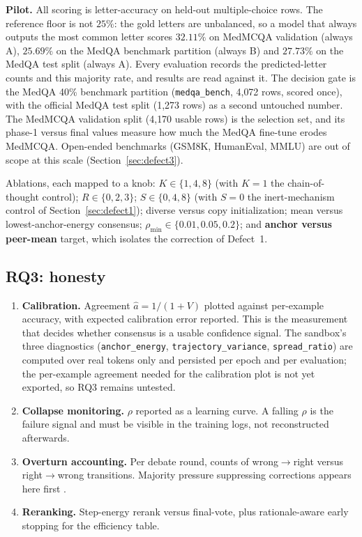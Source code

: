 \documentclass[11pt,a4paper]{article}
\newcommand{\rhodim}{\rho}
\theoremstyle{plain}
\theoremstyle{definition}
\theoremstyle{remark}
\begin{document}
\noindent
\textbf{Pilot.} All scoring is letter-accuracy on held-out multiple-choice rows.
The reference floor is not $25\%$: the gold letters are unbalanced, so a
model that always outputs the most common letter scores $32.11\%$ on MedMCQA
validation (always A), $25.69\%$ on the MedQA benchmark partition (always B)
and $27.73\%$ on the MedQA test split (always A). Every evaluation records
the predicted-letter counts and this majority rate, and results are read
against it. The decision gate is the MedQA 40\% benchmark partition
(\texttt{medqa\_bench}, 4{,}072 rows, scored once), with the official MedQA
test split (1{,}273 rows) as a second untouched number. The MedMCQA validation
split (4{,}170 usable rows) is the selection set, and its phase-1 versus final values
measure how much the MedQA fine-tune erodes MedMCQA. Open-ended benchmarks
(GSM8K, HumanEval, MMLU) are out of scope at this scale
(Section~\ref{sec:defect3}).

\noindent
Ablations, each mapped to a knob: $K \in \{1,4,8\}$ (with $K{=}1$ the
chain-of-thought control); $R \in \{0,2,3\}$; $S \in \{0,4,8\}$ (with
$S{=}0$ the inert-mechanism control of Section~\ref{sec:defect1}); diverse
versus copy initialization; mean versus lowest-anchor-energy consensus;
$\rhodim_{\min} \in \{0.01, 0.05, 0.2\}$; and \textbf{anchor versus peer-mean}
target, which isolates the correction of Defect~1.

\subsection{RQ3: honesty}

\begin{enumerate}
  \item \textbf{Calibration.} Agreement $\hat a = 1/(1+V)$ plotted against
    per-example accuracy, with expected calibration error reported. This is the
    measurement that decides whether consensus is a usable confidence signal.
    The sandbox's three diagnostics (\texttt{anchor\_energy},
    \texttt{trajectory\_variance}, \texttt{spread\_ratio}) are computed over
    real tokens only and persisted per epoch and per evaluation; the
    per-example agreement needed for the calibration plot is not yet
    exported, so RQ3 remains untested.
  \item \textbf{Collapse monitoring.} $\rhodim$ reported as a learning curve.
    A falling $\rhodim$ is the failure signal and must be visible in the
    training logs, not reconstructed afterwards.
  \item \textbf{Overturn accounting.} Per debate round, counts of
    wrong$\rightarrow$right versus right$\rightarrow$wrong transitions. Majority
    pressure suppressing corrections appears here first
    \cite{wu2025debate}.
  \item \textbf{Reranking.} Step-energy rerank versus final-vote, plus
    rationale-aware early stopping \cite{wan2025rasc} for the efficiency table.
\end{enumerate}
\end{document}

